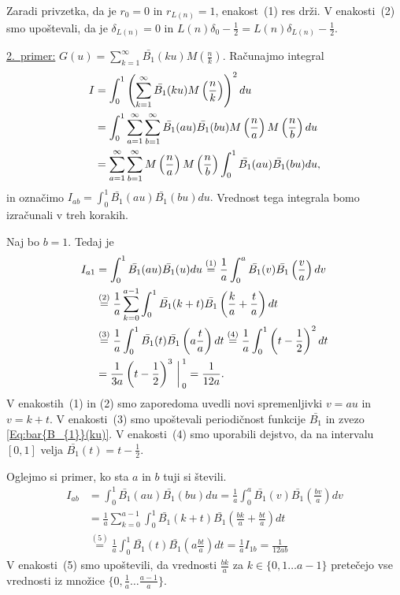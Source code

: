 \documentclass[mat1]{fmfdelo}
\begin{document}
Zaradi privzetka, da je $r_{0}=0$ in $r_{L(n)}=1$, enakost~(1) res drži.
V enakosti~(2) smo upoštevali, da je $\delta_{L(n)}=0$ in $L(n) \delta_{0}-\frac{1}{2} = L(n) \delta_{L(n)}-\frac{1}{2}.$

\underline{2.~primer:} $G(u) = \sum_{k=1}^{\infty} \bar{B_{1}}(ku) M \left(\frac{n}{k} \right)$.
Računajmo integral
\begin{align}
\label{Eq:I_{ab}}
I &= \int_{0}^1 \left( \sum_{k=1}^{\infty} \bar{B_{1}}(ku) M \left(\frac{n}{k} \right) \right)^2 du \nonumber \\
  &= \int_{0}^1 \sum_{a=1}^{\infty} \sum_{b=1}^{\infty} \bar{B_{1}}(au) \bar{B_{1}}(bu) M \left(\frac{n}{a} \right) M \left(\frac{n}{b} \right) du \nonumber \\
  &= \sum_{a=1}^{\infty} \sum_{b=1}^{\infty} M \left(\frac{n}{a} \right) M \left(\frac{n}{b} \right) \int_{0}^1 \bar{B_{1}}(au) \bar{B_{1}}(bu) du,
\end{align}
% 
in označimo $I_{ab} = \int_{0}^1 \bar{B_{1}}(au) \bar{B_{1}}(bu) du.$ Vrednost tega integrala bomo izračunali v treh korakih.

Naj bo $b=1$. Tedaj je
\begin{align}
I_{a1} &= \int_{0}^1 \bar{B_{1}}(au) \bar{B_{1}}(u) du
	\stackrel{(1)}{=} \frac{1}{a} \int_{0}^a \bar{B_{1}}(v) \bar{B_{1}} \left(\frac{v}{a} \right) dv \nonumber \\
	&\stackrel{(2)}{=} \frac{1}{a} \sum_{k=0}^{a-1} \int_{0}^1 \bar{B_{1}}(k+t) \bar{B_{1}} \left(\frac{k}{a}+\frac{t}{a} \right) dt \nonumber \\
	&\stackrel{(3)}{=} \frac{1}{a} \int_{0}^1 \bar{B_{1}}(t) \bar{B_{1}} \left(a\frac{t}{a} \right) dt
	\stackrel{(4)}{=} \frac{1}{a} \int_{0}^1 \left( t-\frac{1}{2} \right)^2 dt \nonumber \\
	&= \frac{1}{3a} \left( t-\frac{1}{2} \right)^3 \bigg \arrowvert_{0}^{1}
	= \frac{1}{12a}.
\end{align}
V enakostih~(1) in (2) smo zaporedoma uvedli novi spremenljivki $v=au$ in $v=k+t$. V enakosti~(3) smo upoštevali periodičnost funkcije $\bar{B_{1}}$ in zvezo \eqref{Eq:bar{B_{1}}(ku)}. V enakosti~(4) smo uporabili dejstvo, da na intervalu $[0,1]$ velja $\bar{B_{1}}(t) = t-\frac{1}{2}$.

Oglejmo si primer, ko sta $a$ in $b$ tuji si števili.
\begin{align}
I_{ab} &= \int_{0}^1 \bar{B_{1}}(au) \bar{B_{1}}(bu) du
	= \frac{1}{a} \int_{0}^a \bar{B_{1}}(v) \bar{B_{1}} \left(\frac{bv}{a} \right) dv \nonumber \\
	&= \frac{1}{a} \sum_{k=0}^{a-1} \int_{0}^1 \bar{B_{1}}(k+t) \bar{B_{1}} \left(\frac{bk}{a}+\frac{bt}{a} \right) dt \nonumber \\
	&\stackrel{(5)}{=} \frac{1}{a} \int_{0}^1 \bar{B_{1}}(t) \bar{B_{1}} \left(a\frac{bt}{a} \right) dt
	= \frac{1}{a} I_{1b} 
	= \frac{1}{12ab} 
\end{align}
V enakosti~(5) smo upoštevili, da vrednosti $\frac{bk}{a}$ za $k \in \{0,1 \ldots a-1 \}$ pretečejo vse vrednosti iz množice $\{0, \frac{1}{a} \ldots \frac{a-1}{a}\}$.
\end{document}
